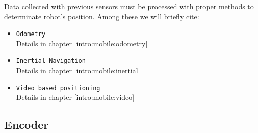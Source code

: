 Data collected with previous sensors must be processed with proper methods to
determinate robot's position. Among these we will briefly cite: 
\begin{itemize}
\item \texttt{Odometry} \\
  Details in chapter \ref{intro:mobile:odometry}
\item \texttt{Inertial Navigation} \\
  Details in chapter \ref{intro:mobile:inertial}
\item \texttt{Video based positioning} \\
  Details in chapter \ref{intro:mobile:video}
\end{itemize}


\subsection{Encoder}
\label{intro:mobile:encoder}



